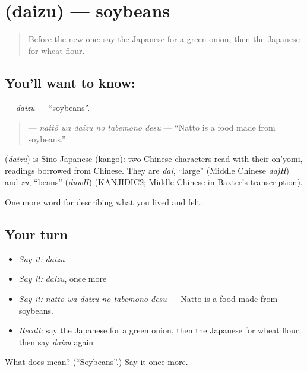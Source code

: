 \section[\texorpdfstring{\ja{だいず} (daizu)}{だいず (daizu)}]{ (daizu) — soybeans}

\label{lesson:JA-C472-daizu}



\begin{quote}
Before the new one: say the Japanese for a green onion, then the Japanese for wheat flour.
\end{quote}

\subsection*{You'll want to know: }
\textbf{} — \emph{daizu} — \textquotedblleft{}soybeans\textquotedblright{}.

\begin{quote}
\textbf{  } — \emph{nattō wa daizu no tabemono desu} — \textquotedblleft{}Natto is a food made from soybeans.\textquotedblright{}
\end{quote}

\begin{cousinweb}
\textbf{} (\emph{daizu}) is Sino-Japanese (kango): two Chinese characters read with their on'yomi, readings borrowed from Chinese. They are \emph{dai}, \textquotedblleft{}large\textquotedblright{} (Middle Chinese \emph{dajH}) and \emph{zu}, \textquotedblleft{}beans\textquotedblright{} (\emph{duwH}) (KANJIDIC2; Middle Chinese in Baxter's transcription).
\end{cousinweb}

\begin{grammarlens}[title={What you've built}]
One more word for describing what you lived and felt.
\end{grammarlens}

\subsection*{Your turn}
\begin{itemize}
\raggedright
  \item \emph{Say it:} \emph{daizu}
  \item \emph{Say it:} \emph{daizu}, once more
  \item \emph{Say it:} \emph{nattō wa daizu no tabemono desu} — Natto is a food made from soybeans.
  \item \emph{Recall:} say the Japanese for a green onion, then the Japanese for wheat flour, then say \emph{daizu} again
\end{itemize}

\begin{tcolorbox}[breakable,colback=teal!4,colframe=teal!35!black,title={Before you move on}]
What does  mean? (\textquotedblleft{}Soybeans\textquotedblright{}.) Say it once more.
\end{tcolorbox}
